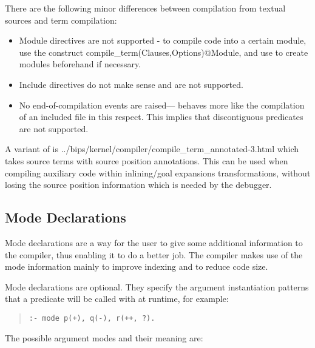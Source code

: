 There are the following minor differences between compilation from
textual sources and term compilation:
\begin{itemize}
\item Module directives are not supported - to compile code into a certain
    module, use the construct compile_term(Clauses,Options)@Module, and use
    to create modules beforehand if necessary.
\item Include directives do not make sense and are not supported.
\item No end-of-compilation events are raised---
  behaves more
    like the compilation of an included file in this respect. This implies
    that discontiguous predicates are not supported.
\end{itemize}

A variant of  is
%
{../bips/kernel/compiler/compile_term_annotated-3.html}
which takes source terms with source position annotations.
This can be used when compiling auxiliary code within inlining/goal
expansions transformations, without losing the source position information
which is needed by the debugger.


\subsection{Mode Declarations}
Mode declarations are a way for the user to give some additional
information to the compiler, thus enabling it to do a better job.
The {\eclipse} compiler makes use of the mode information mainly to
improve indexing and to reduce code size.

Mode declarations are optional. They specify the argument instantiation
patterns that a predicate will be called with at runtime, for example:
\begin{quote}
\begin{verbatim}
:- mode p(+), q(-), r(++, ?).
\end{verbatim}
\end{quote}
The possible argument modes and their meaning are:

